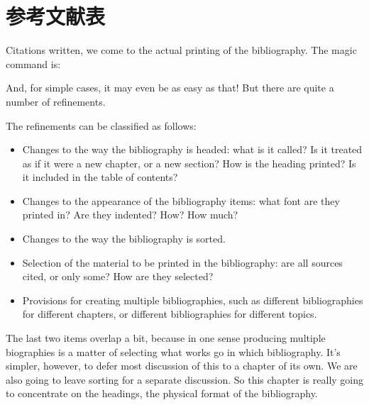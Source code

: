 \chapter{参考文献表}
\label{ch:bibliographyformat}

Citations written, we come to the actual printing of the
bibliography. The magic command is:
\begin{center}
\end{center}
And, for simple cases, it may even be as easy as that! But there are
quite a number of refinements.

The refinements can be classified as follows:
\begin{itemize}
\item Changes to the way the bibliography is headed: what is it
  called? Is it treated as if it were a new chapter, or a new section?
  How is the heading printed? Is it included in the table of contents?
\item Changes to the appearance of the bibliography items: what font
  are they printed in? Are they indented? How? How much?
\item Changes to the way the bibliography is sorted.
\item Selection of the material to be printed in the bibliography: are
  all sources cited, or only some? How are they selected?
\item Provisions for creating multiple bibliographies, such as
  different bibliographies for different chapters, or different
  bibliographies for different topics.
\end{itemize}
The last two items overlap a bit, because in one sense producing
multiple biographies is a matter of selecting what works go in which
bibliography. It's simpler, however, to defer most discussion of this
to a chapter of its own. We are
also going to leave sorting for a separate discussion. So this chapter
is really going to concentrate on the headings, the physical format of
the bibliography.

